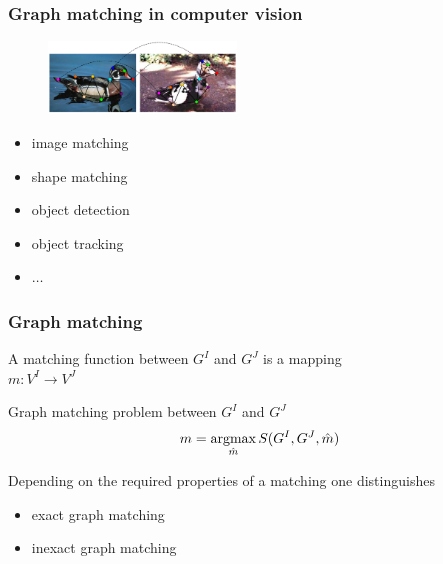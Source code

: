 \documentclass[hyperref={pdfpagelabels=false}]{beamer}
\def\argmax{\mathop{\rm argmax}}						%
\begin{document}
\begin{frame}
\frametitle{Graph matching in computer vision}
\begin{figure}[t]
    \centering
    \includegraphics[width=5cm]{fig/ducks_12.pdf}
\end{figure}
\begin{itemize}
\item image matching
\item shape matching
\item object detection
\item object tracking
\item $\dots$
\end{itemize}
\end{frame}
\begin{frame}
\frametitle{Graph matching}

A matching function between $G^I$ and $G^J$ is a mapping %
\\
{\hspace{4cm}$m:V^I\rightarrow V^J$}

Graph matching problem between $G^I$ and $G^J$ 
\begin{equation*}
m = \argmax_{\hat{m}}S(G^I, G^J, \hat{m})
\end{equation*}


Depending on the required properties of a matching one distinguishes
\begin{itemize}
\item exact graph matching
\item inexact graph matching
\end{itemize}

\end{frame}
\end{document}

